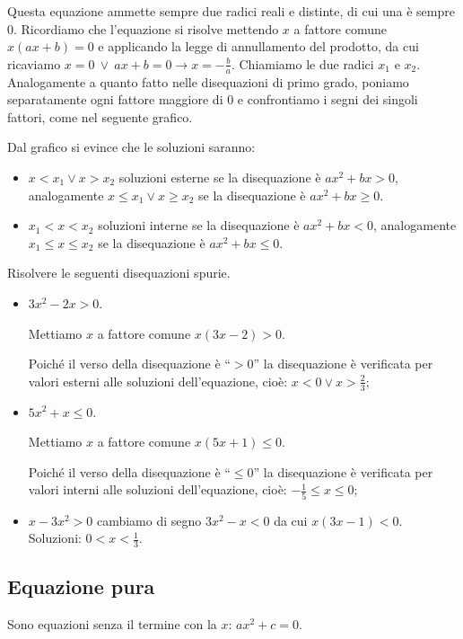 Questa equazione ammette sempre due radici reali e distinte, di cui una è sempre $0$. Ricordiamo che l'equazione si risolve mettendo $x$ a fattore comune $x(ax+b)=0$ e applicando la legge di annullamento del prodotto, da cui ricaviamo $x=0\ \vee \ ax+b=0\rightarrow x=-\frac b a$. Chiamiamo le due radici $x_1$ e $x_2$. Analogamente a quanto fatto nelle disequazioni di primo grado, poniamo separatamente ogni fattore maggiore di $0$ e confrontiamo i segni dei singoli fattori, come nel seguente grafico.
\begin{center}

\end{center}
Dal grafico si evince che le soluzioni saranno:
\begin{itemize}
\item $x<x_1\vee x>x_2$ soluzioni esterne se la disequazione è $ax^2+bx>0$, analogamente $x\le x_1\vee x\ge x_2$ se la disequazione è $ax^2+bx\ge 0$.
\item $x_1<x<x_2$ soluzioni interne se la disequazione è $ax^2+bx<0$, analogamente $x_1\le x\le x_2$ se la disequazione è $ax^2+bx\le 0$.
\end{itemize}
\pagebreak
\begin{exrig}
\begin{esempio}
Risolvere le seguenti disequazioni spurie.
\begin{itemize}
\item $3x^2-2x>0$.

Mettiamo $x$ a fattore comune $x(3x-2)>0$.

Poiché il verso della disequazione è ``$>0$'' la disequazione è verificata per valori esterni alle soluzioni dell'equazione, cioè:  $x<0\vee x>\frac 2 3$;
\item $5x^2+x\le 0$.

Mettiamo $x$ a fattore comune $x(5x+1)\le 0$.

Poiché il verso della disequazione è ``$\le 0$'' la disequazione è verificata per valori interni alle soluzioni dell'equazione, cioè: $-\frac 1 5\le x\le 0$;
\item $x-3x^2>0$ cambiamo di segno $3x^2-x<0$ da cui $x(3x-1)<0$. Soluzioni: $0<x<\frac 1 3$.
\end{itemize}
\end{esempio}
\end{exrig}

\subsection{Equazione pura}
Sono equazioni senza il termine con la $ x $: $ax^2+c=0$.

